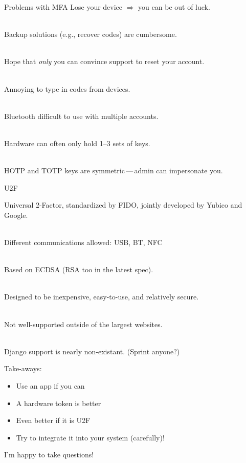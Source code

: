 \documentclass{beamer}
\begin{document}
\begin{frame}{Problems with MFA}
Lose your device $\Rightarrow$ you can be out of luck.

\ \\

Backup solutions (e.g., recover codes) are cumbersome.

\ \\

Hope that \emph{only} you can convince support to reset your account.

\ \\

Annoying to type in codes from devices.

\ \\

Bluetooth difficult to use with multiple accounts.

\ \\

Hardware can often only hold 1--3 sets of keys.

\ \\

HOTP and TOTP keys are symmetric\,---\,admin can impersonate you.


\end{frame}

\begin{frame}{U2F}

Universal 2-Factor, standardized by FIDO, jointly developed by Yubico and Google.

\ \\

Different communications allowed: USB, BT, NFC

\ \\

Based on ECDSA (RSA too in the latest spec).

\ \\

Designed to be inexpensive, easy-to-use, and relatively secure.

\ \\

Not well-supported outside of the largest websites.

\ \\

Django support is nearly non-existant. (Sprint anyone?)

\end{frame}

\begin{frame}

Take-aways:

\begin{itemize}
  \item Use an app if you can
  \item A hardware token is better
  \item Even better if it is U2F
  \item Try to integrate it into your system (carefully)!
\end{itemize}

I'm happy to take questions!

\end{frame}
\end{document}
